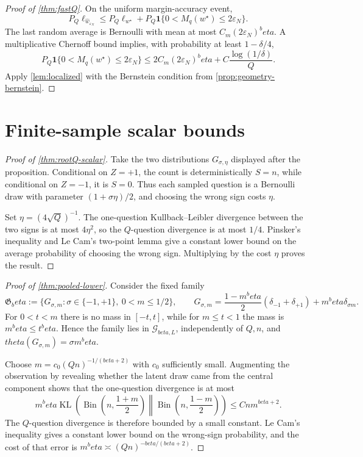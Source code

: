 \documentclass[11pt]{article}
\def\beta{beta}%
\def\theta{theta}%
\newcommand{\one}{\mathbf 1}
\newcommand{\KL}{\operatorname{KL}}
\newcommand{\Bin}{\operatorname{Bin}}
\newcommand{\calG}{\mathcal G}
\newcommand{\eps}{\varepsilon}
\begin{document}
\begin{proof}[Proof of \cref{thm:fastQ}]
On the uniform margin-accuracy event,
\[
P_Q\ell_{\widehat w_{\eps_N}}
\le
P_Q\ell_{w^\star}
+P_Q\one\{0<M_q(w^\star)\le2\eps_N\}.
\]
The last random average is Bernoulli with mean at most $C_m(2\eps_N)^\beta$.  A multiplicative Chernoff bound implies, with probability at least $1-\delta/4$,
\[
P_Q\one\{0<M_q(w^\star)\le2\eps_N\}
\le
2C_m(2\eps_N)^\beta
+C\frac{\log(1/\delta)}{Q}.
\]
Apply \cref{lem:localized} with the Bernstein condition from \cref{prop:geometry-bernstein}.
\end{proof}

\section{Finite-sample scalar bounds}
\label{app:finite-lower}

\begin{proof}[Proof of \cref{thm:rootQ-scalar}]
Take the two distributions $G_{\sigma,\eta}$ displayed after the proposition.  Conditional on $Z=+1$, the count is deterministically $S=n$, while conditional on $Z=-1$, it is $S=0$.  Thus each sampled question is a Bernoulli draw with parameter $(1+\sigma\eta)/2$, and choosing the wrong sign costs $\eta$.

Set $\eta=(4\sqrt Q)^{-1}$.  The one-question Kullback--Leibler divergence between the two signs is at most $4\eta^2$, so the $Q$-question divergence is at most $1/4$.  Pinsker's inequality and Le Cam's two-point lemma give a constant lower bound on the average probability of choosing the wrong sign.  Multiplying by the cost $\eta$ proves the result.
\end{proof}

\begin{proof}[Proof of \cref{thm:pooled-lower}]
Consider the fixed family
\[
\mathfrak G_\beta
:=
\{G_{\sigma,m}:\sigma\in\{-1,+1\},\ 0<m\le1/2\},
\qquad
G_{\sigma,m}
=
\frac{1-m^\beta}{2}(\delta_{-1}+\delta_{+1})
+m^\beta\delta_{\sigma m}.
\]
For $0<t<m$ there is no mass in $[-t,t]$, while for $m\le t<1$ the mass is $m^\beta\le t^\beta$.  Hence the family lies in $\calG_{\beta,L}$, independently of $Q,n$, and $\theta(G_{\sigma,m})=\sigma m^\beta$.

Choose $m=c_0(Qn)^{-1/(\beta+2)}$ with $c_0$ sufficiently small.  Augmenting the observation by revealing whether the latent draw came from the central component shows that the one-question divergence is at most
\[
m^\beta
\KL\!\left(
\Bin\left(n,\frac{1+m}{2}\right)
\middle\|
\Bin\left(n,\frac{1-m}{2}\right)
\right)
\le Cnm^{\beta+2}.
\]
The $Q$-question divergence is therefore bounded by a small constant.  Le Cam's inequality gives a constant lower bound on the wrong-sign probability, and the cost of that error is $m^\beta\asymp(Qn)^{-\beta/(\beta+2)}$.
\end{proof}
\end{document}
